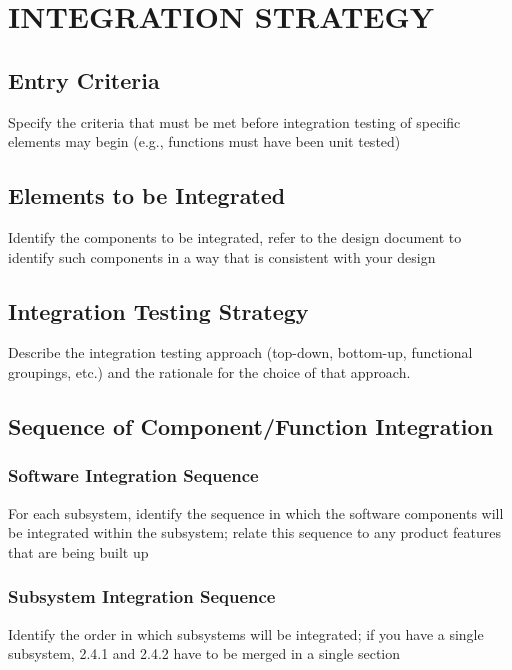 \section{INTEGRATION STRATEGY}
\subsection{Entry Criteria} Specify the criteria that must be met before integration testing of specific elements may begin (e.g., functions must have been unit tested)
\subsection{Elements to be Integrated} Identify the components to be integrated, refer to the design document to identify such components in a way that is consistent with your design
\subsection{Integration Testing Strategy} Describe the integration testing approach (top-down, bottom-up, functional groupings, etc.) and the rationale for the choice of that approach.
\subsection{Sequence of Component/Function Integration} 
\subsubsection{Software Integration Sequence} For each subsystem, identify the sequence in which the software components will be integrated within the subsystem; relate this sequence to any product features that are being built up
\subsubsection{Subsystem Integration Sequence} Identify the order in which subsystems will be integrated;  if you have a single subsystem, 2.4.1 and 2.4.2 have to be merged in a single section





